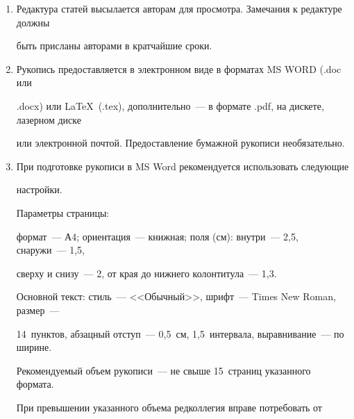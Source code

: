 {{\begin{enumerate}[1.]
\item Редактура статей высылается авторам для просмотра. Замечания к редактуре должны


быть присланы авторами в кратчайшие сроки.\\[-12pt]





\item Рукопись предоставляется в электронном виде в форматах MS WORD (.doc или


.docx) или \LaTeX\  (.tex), дополнительно~--- в формате .pdf, на дискете, лазерном диске


или электронной почтой. Предоставление бумажной рукописи необязательно.\\[-12pt]





\item При подготовке рукописи в MS Word рекомендуется использовать следующие


настройки.





Параметры страницы:


формат~--- А4; ориентация~--- книжная; поля (см): внутри~--- 2,5, снаружи~--- 1,5,


сверху и снизу~--- 2, от края до нижнего колонтитула~--- 1,3.





Основной текст: стиль~--- <<Обычный>>, шрифт~--- Times New Roman, размер~---


14~пунк\-тов, абзацный отступ~--- 0,5~см, 1,5~интервала, выравнивание~--- по ширине.















 \thispagestyle{empty}





Рекомендуемый объем рукописи~--- не свыше 15~страниц указанного формата.


При превышении указанного объема редколлегия вправе потребовать от 



\end{enumerate}}}
